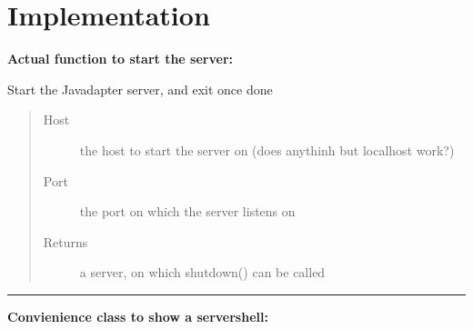 \documentclass[letterpaper,10pt,english]{sphinxmanual}
\begin{document}
\section{Implementation}
\label{javadapter:implementation}
\textbf{Actual function to start the server:}

\begin{fulllineitems}
\label{javadapter:javadapter.server.start}
Start the Javadapter server, and exit once done
\begin{quote}\begin{description}
\item[{Host }] \leavevmode
the host to start the server on (does anythinh but localhost work?)

\item[{Port }] \leavevmode
the port on which the server listens on

\item[{Returns}] \leavevmode
a server, on which shutdown() can be called

\end{description}\end{quote}

\end{fulllineitems}



\bigskip\hrule{}\bigskip


\textbf{Convienience class to show a servershell:}
\end{document}
